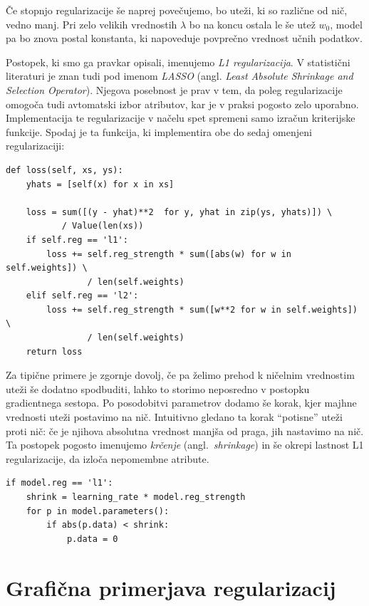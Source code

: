 Če stopnjo regularizacije še naprej povečujemo, bo uteži, ki so različne od nič, vedno manj. Pri zelo velikih vrednostih $\lambda$ bo na koncu ostala le še utež $w_0$, model pa bo znova postal konstanta, ki napoveduje povprečno vrednost učnih podatkov.

Postopek, ki smo ga pravkar opisali, imenujemo \emph{L1 regularizacija}. V statistični literaturi je znan tudi pod imenom \emph{LASSO} (angl. \emph{Least Absolute Shrinkage and Selection Operator}). Njegova posebnost je prav v tem, da poleg regularizacije omogoča tudi avtomatski izbor atributov, kar je v praksi pogosto zelo uporabno. Implementacija te regularizacije v načelu spet spremeni samo izračun kriterijske funkcije. Spodaj je ta funkcija, ki implementira obe do sedaj omenjeni regularizaciji:

\vspace*{3mm}
\begin{lstlisting}
def loss(self, xs, ys):
    yhats = [self(x) for x in xs]

    loss = sum([(y - yhat)**2  for y, yhat in zip(ys, yhats)]) \
           / Value(len(xs))
    if self.reg == 'l1':
        loss += self.reg_strength * sum([abs(w) for w in self.weights]) \
                / len(self.weights)
    elif self.reg == 'l2':
        loss += self.reg_strength * sum([w**2 for w in self.weights]) \
                / len(self.weights)
    return loss
\end{lstlisting}

Za tipične primere je zgornje dovolj, če pa želimo prehod k ničelnim vrednostim uteži še dodatno spodbuditi, lahko to storimo neposredno v postopku gradientnega sestopa. Po posodobitvi parametrov dodamo še korak, kjer majhne vrednosti uteži postavimo na nič. Intuitivno gledano ta korak ``potisne'' uteži proti nič: če je njihova absolutna vrednost manjša od praga, jih nastavimo na nič. Ta postopek pogosto imenujemo \emph{krčenje} (angl.~\emph{shrinkage}) in še okrepi lastnost L1 regularizacije, da izloča nepomembne atribute.

\vspace*{3mm}
\begin{lstlisting}
if model.reg == 'l1':
    shrink = learning_rate * model.reg_strength
    for p in model.parameters():
        if abs(p.data) < shrink:
            p.data = 0
\end{lstlisting}


\section{Grafična primerjava regularizacij}

